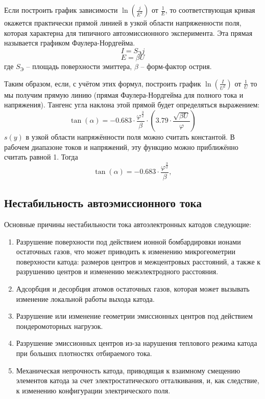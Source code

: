 \documentclass[a4paper, 12pt]{article}
\begin{document}
	Если построить график зависимости $\ln \left(\frac{j}{E^2} \right)$ от $\frac{1}{E}$, то соответствующая кривая окажется практически прямой линией в узкой области напряженности поля, которая характерна для типичного автоэмиссионного эксперимента. Эта прямая называется графиком Фаулера-Нордгейма.
	\begin{equation*}
		I=S_{\text{Э}}j
	\end{equation*}
	\begin{equation*}
		E=\beta U
	\end{equation*}
	где $S_{\text{Э}}$ -- площадь поверхности эмиттера, $\beta$ -- форм-фактор острия.\par
	Таким образом, если, с учётом этих формул, построить график $\ln \left(\frac{I}{U^2} \right)$ от $\frac{1}{U}$ то мы получим прямую линию (прямая Фаулера-Нордгейма для полного тока и напряжения). Тангенс угла наклона этой прямой будет определяться выражением:
	\begin{equation}
		\tan(\alpha)=-0.683\cdot\frac{\varphi^{\frac{3}{2}}}{\beta}\cdot\left(3.79\cdot\frac{\sqrt{\beta U}}{\varphi} \right)
	\end{equation}
	$s(y)$ в узкой области напряжённости поля можно считать константой. В рабочем диапазоне токов и напряжений, эту функцию можно приближённо считать равной 1. Тогда
	\begin{equation}
		\tan(\alpha)=-0.683\cdot\frac{\varphi^{\frac{3}{2}}}{\beta},
	\end{equation}
	\subsection{Нестабильность автоэмиссионного тока}
	Основные причины нестабильности тока автоэлектронных катодов следующие:
	\begin{enumerate}
		\item Разрушение поверхности под действием ионной бомбардировки ионами остаточных газов, что может приводить к изменению микрогеометрии поверхности катода: размеров центров и межцентровых расстояний, а также к разрушению центров и изменению межэлектродного расстояния.
		\item Адсорбция и десорбция атомов остаточных газов, которая может вызывать изменение локальной работы выхода катода.
		\item Разрушение или изменение геометрии эмиссионных центров под действием пондеромоторных нагрузок.
		\item Разрушение эмиссионных центров из-за нарушения теплового режима катода при больших плотностях отбираемого тока.
		\item Механическая непрочность катода, приводящая к взаимному смещению элементов катода за счет электростатического отталкивания, и, как следствие, к изменению конфигурации электрического поля.
	\end{enumerate}
\end{document}
